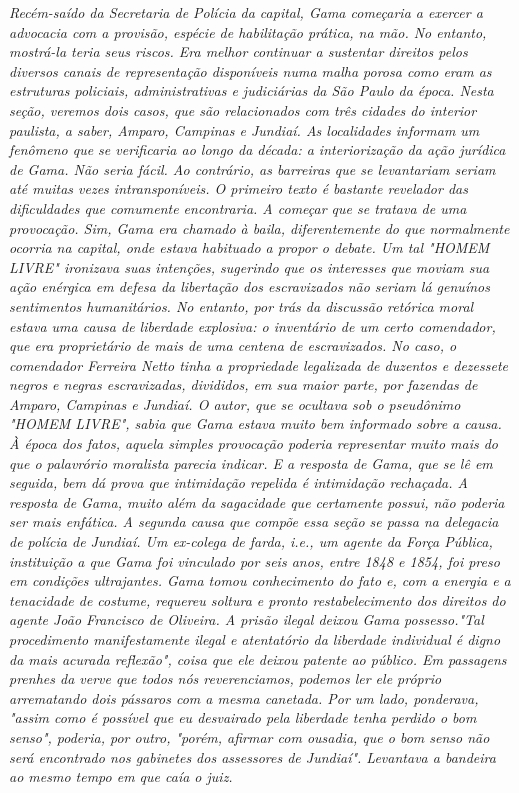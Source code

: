 \emph{Recém-saído da Secretaria de Polícia da capital, Gama começaria a
exercer a advocacia com a provisão, espécie de habilitação prática, na
mão. No entanto, mostrá-la teria seus riscos. Era melhor continuar a
sustentar direitos pelos diversos canais de representação disponíveis
numa malha porosa como eram as estruturas policiais, administrativas e
judiciárias da São Paulo da época. Nesta seção, veremos dois casos, que
são relacionados com três cidades do interior paulista, a saber, Amparo,
Campinas e Jundiaí. As localidades informam um fenômeno que se
verificaria ao longo da década: a interiorização da ação jurídica de
Gama. Não seria fácil. Ao contrário, as barreiras que se levantariam
seriam até muitas vezes intransponíveis. O primeiro texto é bastante
revelador das dificuldades que comumente encontraria. A começar que se
tratava de uma provocação. Sim, Gama era chamado à baila, diferentemente
do que normalmente ocorria na capital, onde estava habituado a propor o
debate. Um tal "HOMEM LIVRE" ironizava suas intenções, sugerindo que os
interesses que moviam sua ação enérgica em defesa da libertação dos
escravizados não seriam lá genuínos sentimentos humanitários. No
entanto, por trás da discussão retórica moral estava uma causa de
liberdade explosiva: o inventário de um certo comendador, que era
proprietário de mais de uma centena de escravizados. No caso, o
comendador Ferreira Netto tinha a propriedade legalizada de duzentos e
dezessete negros e negras escravizadas, divididos, em sua maior parte,
por fazendas de Amparo, Campinas e Jundiaí. O autor, que se ocultava sob
o pseudônimo "HOMEM LIVRE", sabia que Gama estava muito bem informado
sobre a causa. À época dos fatos, aquela simples provocação poderia
representar muito mais do que o palavrório moralista parecia indicar. E
a resposta de Gama, que se lê em seguida, bem dá prova que intimidação
repelida é intimidação rechaçada. A resposta de Gama, muito além da
sagacidade que certamente possui, não poderia ser mais enfática. A
segunda causa que compõe essa seção se passa na delegacia de polícia de
Jundiaí. Um ex-colega de farda, i.e., um agente da Força Pública,
instituição a que Gama foi vinculado por seis anos, entre 1848 e 1854,
foi preso em condições ultrajantes. Gama tomou conhecimento do fato e,
com a energia e a tenacidade de costume, requereu soltura e pronto
restabelecimento dos direitos do agente João Francisco de Oliveira. A
prisão ilegal deixou Gama possesso."Tal procedimento manifestamente
ilegal e atentatório da liberdade individual é digno da mais acurada
reflexão", coisa que ele deixou patente ao público. Em passagens prenhes
da verve que todos nós reverenciamos, podemos ler ele próprio
arrematando dois pássaros com a mesma canetada. Por um lado, ponderava,
"assim como é possível que eu desvairado pela liberdade tenha perdido o
bom senso", poderia, por outro, "porém, afirmar com ousadia, que o bom
senso não será encontrado nos gabinetes dos assessores de Jundiaí".
Levantava a bandeira ao mesmo tempo em que caía o juiz.}

